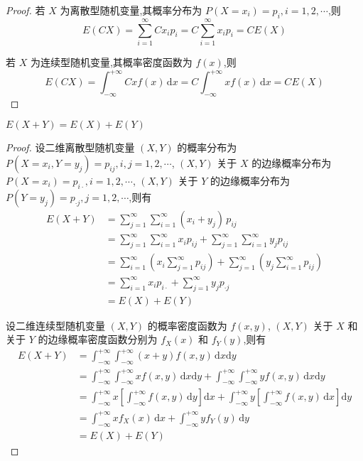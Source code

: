 \begin{proof}
    若 $X$ 为离散型随机变量,其概率分布为 $P(X=x_i)=p_i, i=1,2,\cdots$,则
    $$
    E(CX) = \sum_{i=1}^{\infty} C x_i p_i = C \sum_{i=1}^{\infty} x_i p_i = CE(X)
    $$

    若 $X$ 为连续型随机变量,其概率密度函数为 $f(x)$,则
    $$
    E(CX) = \int_{-\infty}^{+\infty} Cx f(x) \, \text{d}x = C \int_{-\infty}^{+\infty} x f(x) \, \text{d}x = CE(X)
    $$
\end{proof}

\begin{property}[][][property:E(X+Y)=E(X)+E(Y)]
    \indent $E(X+Y)=E(X)+E(Y)$
\end{property}

\begin{proof}
    设二维离散型随机变量 $(X,Y)$ 的概率分布为 $P(X=x_i,Y=y_j) = p_{ij}, i,j=1,2,\cdots$, $(X,Y)$ 关于 $X$ 的边缘概率分布为 $P(X=x_i)=p_{i\cdot}, i=1,2,\cdots$, $(X,Y)$ 关于 $Y$ 的边缘概率分布为 $P(Y=y_j)=p_{\cdot j}, j=1,2,\cdots$,则有
    $$
    \begin{aligned}
        E(X+Y) &= \sum_{j=1}^{\infty} \sum_{i=1}^{\infty} (x_i + y_j) \, p_{ij} \\
        &= \sum_{j=1}^{\infty} \sum_{i=1}^{\infty} x_i p_{ij} + \sum_{j=1}^{\infty} \sum_{i=1}^{\infty} y_j p_{ij} \\
        &= \sum_{i=1}^{\infty} \left( x_i \sum_{j=1}^{\infty} p_{ij} \right) + \sum_{j=1}^{\infty} \left( y_j \sum_{i=1}^{\infty} p_{ij} \right) \\
        &= \sum_{i=1}^{\infty} x_i p_{i \cdot} + \sum_{j=1}^{\infty} y_j p_{\cdot j} \\
        &= E(X)+E(Y)
    \end{aligned}
    $$

    设二维连续型随机变量 $(X,Y)$ 的概率密度函数为 $f(x,y)$, $(X,Y)$ 关于 $X$ 和关于 $Y$ 的边缘概率密度函数分别为 $f_X(x)$ 和 $f_Y(y)$,则有
    $$
    \begin{aligned}
        E(X+Y) &= \int_{-\infty}^{+\infty} \int_{-\infty}^{+\infty} (x+y) f(x,y) \, \text{d}x \text{d}y \\
        &= \int_{-\infty}^{+\infty} \int_{-\infty}^{+\infty} x f(x,y) \, \text{d}x \text{d}y + \int_{-\infty}^{+\infty} \int_{-\infty}^{+\infty} y f(x,y) \, \text{d}x \text{d}y \\
        &= \int_{-\infty}^{+\infty} x \left[ \int_{-\infty}^{+\infty} f(x,y) \, \text{d}y \right] \text{d}x + \int_{-\infty}^{+\infty} y \left[ \int_{-\infty}^{+\infty} f(x,y) \, \text{d}x \right] \text{d}y \\
        &= \int_{-\infty}^{+\infty} x f_X(x) \, \text{d}x + \int_{-\infty}^{+\infty} y f_Y(y) \, \text{d}y \\
        &= E(X)+E(Y)
    \end{aligned}
    $$
\end{proof}

